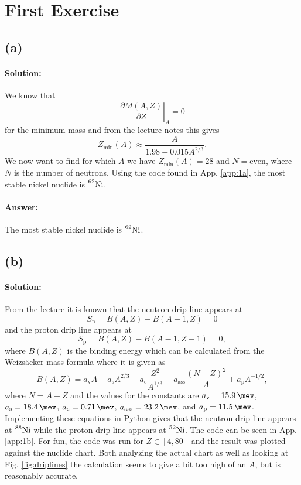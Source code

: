 \section{First Exercise}
\subsection*{(a)}
\paragraph{Solution:} We know that 
\begin{equation}
    \left.\frac{\partial M(A,Z)}{\partial Z} \right|_A = 0
\end{equation}
for the minimum mass and from the lecture notes this gives 
\begin{equation}
    Z_\text{min}(A) \approx \frac{A}{1.98 + 0.015 A^{2/3}}.
\end{equation}
We now want to find for which $A$ we have $Z_\text{min} (A) = 28$ and $N = \text{even}$, where $N$ is the number of neutrons. Using the code found in App. \ref{app:1a}, the most stable nickel nuclide is $\nuc{Ni}{62}{}$.
\paragraph{Answer:} The most stable nickel nuclide is $\nuc{Ni}{62}{}$.

\subsection*{(b)}
\paragraph{Solution:} From the lecture it is known that the neutron drip line appears at
\begin{equation}
    S_\text{n} = B(A,Z) - B(A-1,Z) = 0
\end{equation}
and the proton drip line appears at
\begin{equation}
    S_\text{p} = B(A,Z) - B(A-1,Z-1) = 0,
\end{equation}
where $B(A,Z)$ is the binding energy which can be calculated from the Weizsäcker mass formula where it is given as
\begin{equation}
    B(A,Z) = a_\text{v} A - a_\text{s} A^{2/3} - a_\text{c} \frac{Z^2}{A^{1/3}} - a_\text{ass} \frac{(N - Z)^2}{A} + a_\text{p} A^{-1/2},   
\end{equation}
where $N = A - Z$ and the values for the constants are $a_\text{v} = \SI{15.9}{\mev}$, $a_\text{s} = \SI{18.4}{\mev}$, $a_\text{c} = \SI{0.71}{\mev}$, $a_\text{ass} = \SI{23.2}{\mev}$, and $a_\text{p} = \SI{11.5}{\mev}$. Implementing these equations in Python gives that the neutron drip line appears at $\nuc{Ni}{88}{}$ while the proton drip line appears at $\nuc{Ni}{52}{}$. The code can be seen in App. \ref{app:1b}. For fun, the code was run for $Z \in [4, 80]$ and the result was plotted against the nuclide chart. Both analyzing the actual chart as well as looking at Fig. \ref{fig:driplines} the calculation seems to give a bit too high of an $A$, but is reasonably accurate.

